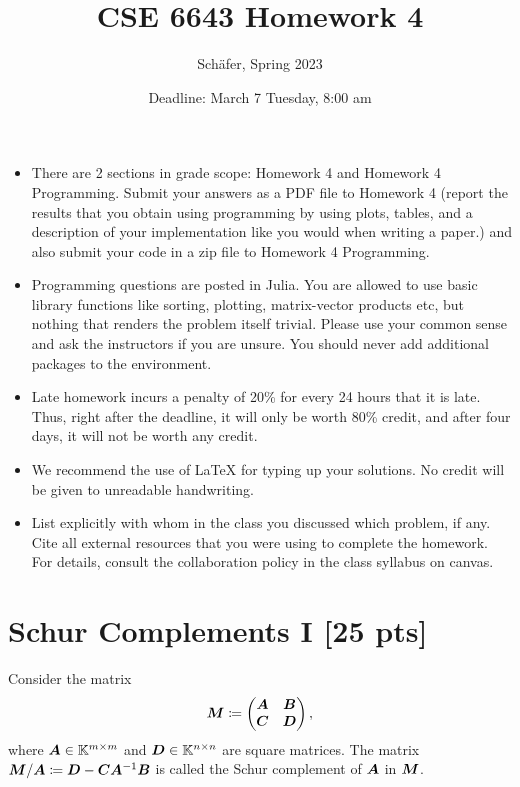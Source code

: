 \documentclass[twoside,10pt]{article}
\begin{document}
\title{CSE 6643 Homework 4}
\author{Sch{\"a}fer, Spring 2023}
\date{Deadline: March 7 Tuesday, 8:00 am}
\maketitle

\begin{itemize}
  \item There are 2 sections in grade scope: Homework 4 and Homework 4 Programming. Submit your answers as a PDF file to Homework 4 (report the results that you obtain using programming by using plots, tables, and a description of your implementation like you would when writing a paper.) and also submit your code in a zip file to Homework 4 Programming. 
  \item Programming questions are posted in Julia. You are allowed to use basic library functions like sorting, plotting, matrix-vector products etc, but nothing that renders the problem itself trivial. Please use your common sense and ask the instructors if you are unsure. 
  You should never add additional packages to the environment.
  \item Late homework incurs a penalty of 20\% for every 24 hours that it is late. Thus, right after the deadline, it will only be worth 80\% credit, and after four days, it will not be worth any credit. 
  \item We recommend the use of LaTeX for typing up your solutions. No credit will be given to unreadable handwriting.
  \item List explicitly with whom in the class you discussed which problem, if any. Cite all external resources that you were using to complete the homework. For details, consult the collaboration policy in the class syllabus on canvas.
\end{itemize}


\section{Schur Complements I [25 pts]}
Consider the matrix 
\begin{equation}
  \bm{M}
  \coloneqq
  \begin{pmatrix}
    \bm{A} & \bm{B}\\
    \bm{C} & \bm{D}
  \end{pmatrix}, 
\end{equation}
where $\bm{A} \in \mathbb{K}^{m \times m}$ and $\bm{D} \in \mathbb{K}^{n \times n}$ are square matrices.
The matrix $\bm{M}/\bm{A} \coloneqq \bm{D} - \bm{C} \bm{A}^{-1} \bm{B}$ is called the Schur complement of $\bm{A}$ in $\bm{M}$.    
\end{document}
